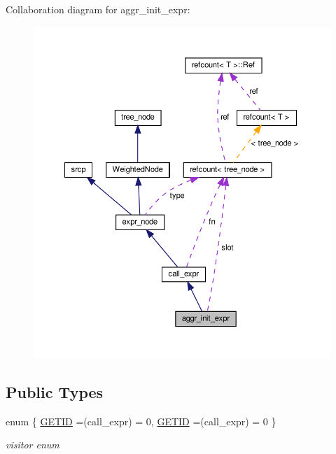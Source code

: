 Collaboration diagram for aggr\+\_\+init\+\_\+expr\+:
\nopagebreak
\begin{figure}[H]
\begin{center}
\leavevmode
\includegraphics[width=350pt]{de/d0e/structaggr__init__expr__coll__graph}
\end{center}
\end{figure}
\subsection*{Public Types}
\begin{DoxyCompactItemize}
\item 
enum \{ \hyperlink{structaggr__init__expr_a64d72b4bc2275c499fdb0f20ed45cdaba6678e6440180ee3622f3d4108d901370}{G\+E\+T\+ID} =(call\+\_\+expr) = 0, 
\hyperlink{structaggr__init__expr_a64d72b4bc2275c499fdb0f20ed45cdaba6678e6440180ee3622f3d4108d901370}{G\+E\+T\+ID} =(call\+\_\+expr) = 0
 \}\begin{DoxyCompactList}\small\item\em visitor enum \end{DoxyCompactList}
\end{DoxyCompactItemize}
